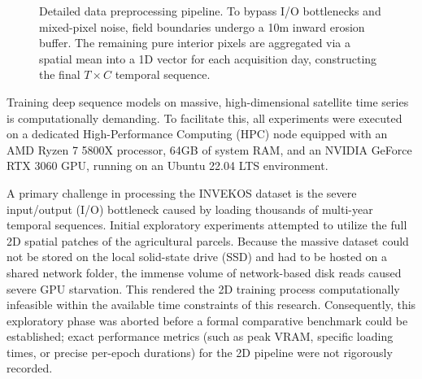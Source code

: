 \begin{figure}[htpb]
{
    }
    \caption{Detailed data preprocessing pipeline.
        To bypass I/O bottlenecks and mixed-pixel noise, field boundaries undergo a 10m inward erosion buffer.
        The remaining pure interior pixels are aggregated via a spatial mean into a 1D vector for each acquisition day,
        constructing the final $T \times C$ temporal sequence.}
    \label{fig:dim_reduction_detailed}
\end{figure}

Training deep sequence models on massive, high-dimensional satellite time series is computationally demanding.
To facilitate this, all experiments were executed on a dedicated High-Performance Computing (HPC) node equipped with an AMD Ryzen 7 5800X processor,
64GB of system RAM, and an NVIDIA GeForce RTX 3060 GPU, running on an Ubuntu 22.04 LTS environment.

A primary challenge in processing the INVEKOS dataset is the severe input/output (I/O) bottleneck caused by loading thousands of multi-year temporal sequences.
Initial exploratory experiments attempted to utilize the full 2D spatial patches of the agricultural parcels.
Because the massive dataset could not be stored on the local solid-state drive (SSD) and had to be hosted on a shared network folder,
the immense volume of network-based disk reads caused severe GPU starvation.
This rendered the 2D training process computationally infeasible within the available time constraints of this research.
Consequently, this exploratory phase was aborted before a formal comparative benchmark could be established;
exact performance metrics (such as peak VRAM, specific loading times, or precise per-epoch durations) for the 2D pipeline were not rigorously recorded. 


